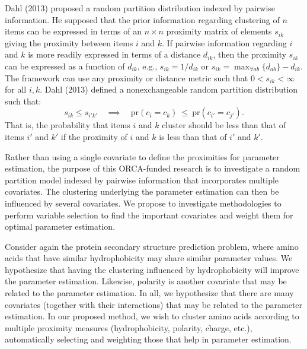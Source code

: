 \documentclass{article}
\begin{document}
  Dahl (2013) proposed a random partition distribution indexed by pairwise information.
  He supposed that the prior information regarding clustering of $n$ items can be
  expressed in terms of an $n \times n$ proximity matrix of elements $s_{ik}$
  giving the proximity between items $i$ and $k$.  If pairwise information
  regarding $i$ and $k$ is more readily expressed in terms of a distance
  $d_{ik}$, then the proximity $s_{ik}$ can be expressed as a function of
  $d_{ik}$, e.g., $s_{ik} = 1/d_{ik}$ or $s_{ik} = \max_{\forall ab}\{d_{ab}\} -
  d_{ik}$.  The framework can use any proximity or distance metric such that $0 <
  s_{ik} < \infty$ for all $i,k$.  Dahl (2013) defined a nonexchangeable random partition
  distribution such that:
  \begin{equation}
  \label{eq_nonuniform}
  s_{ik} \le s_{i'k'} \quad \implies \quad \text{pr}(c_i = c_k) \ \le \ \text{pr}(c_{i'} = c_{j'}).
  \end{equation}
  That is, the probability that items $i$ and $k$ cluster should be less
  than that of items $i'$ and $k'$ if the proximity of $i$ and $k$ is less than
  that of $i'$ and $k'$.

  Rather than using a single covariate to define the proximities for parameter
  estimation, the purpose of this ORCA-funded research is to investigate a random
  partition model indexed by pairwise information that incorporates multiple
  covariates.  The clustering underlying the parameter estimation can then be
  influenced by several covariates.  We propose to investigate methodologies to
  perform variable selection to find the important covariates and weight them for
  optimal parameter estimation.

  Consider again the protein secondary structure prediction problem, where amino
  acids that have similar hydrophobicity may share similar parameter values.  We
  hypothesize that having the clustering influenced by hydrophobicity will improve
  the parameter estimation.  Likewise, polarity is another covariate that may be
  related to the parameter estimation.  In all, we hypothesize that there are many
  covariates (together with their interactions) that may be related to the
  parameter estimation.  In our proposed method, we wish to cluster amino acids
  according to multiple proximity measures (hydrophobicity, polarity, charge,
  etc.), automatically selecting and weighting those that help in parameter
  estimation.

\end{document}
